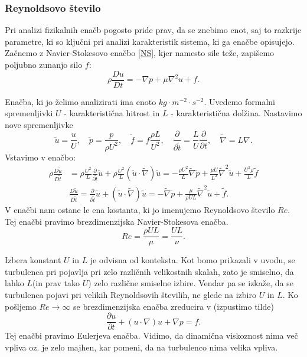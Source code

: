 \documentclass[mat2, tisk]{fmfdelo}
\begin{document}
\subsubsection{Reynoldsovo število}
Pri analizi fizikalnih enačb pogosto pride prav, da se znebimo enot, saj to razkrije 
parametre, ki so ključni pri analizi karakteristik sistema, ki ga enačbe opisujejo. 
Začnemo z Navier-Stokesovo enačbo \eqref{NS}, kjer namesto sile teže, zapišemo 
poljubno zunanjo silo $f$:
$$
\rho \frac{D u}{D t} = - \nabla p + \mu \nabla^2 u + f.
$$

Enačba, ki jo želimo analizirati ima enoto $kg \cdot m^{-2}\cdot s^{-2}$. Uvedemo formalni 
spremenljivki $U$ - karakteristična hitrost in $L$ - karakteristična dolžina. Nastavimo
nove spremenljivke 
$$
\tilde{u} = \frac{u}{U}, \quad \tilde{p} = \frac{p}{\rho U^2}, \quad \tilde{f} = f\frac{\rho L}{U^2},
\quad \frac{\partial}{\partial \tilde{t}} = \frac{L}{U} \frac{\partial}{\partial t}, \quad 
\tilde{\nabla} = L\nabla.
$$
Vstavimo v enačbo:
\begin{align*}
\rho \frac{D\tilde{u}}{D \tilde{t}} &= \rho \frac{U^2}{L} \frac{\partial}{\partial \tilde{t}} \tilde{u} + 
\rho \frac{U^2}{L} (\tilde{u} \cdot \tilde{\nabla}) \tilde{u} = - \frac{\rho U^2}{L} \tilde{\nabla} \tilde{p}
+ \frac{\mu U}{L^2} \tilde{\nabla}^2 \tilde{u} + \frac{U^2 \rho}{L}\tilde{f} \\[2mm]
&\frac{D\tilde{u}}{D \tilde{t}} = \frac{\partial}{\partial \tilde{t}} \tilde{u} + 
(\tilde{u} \cdot \tilde{\nabla}) \tilde{u} = - \tilde{\nabla} \tilde{p}
+ \frac{\mu}{\rho UL} \tilde{\nabla}^2 \tilde{u} + \tilde{f}.
\end{align*}
V enačbi nam ostane le ena kostanta, ki jo imenujemo Reynoldsovo število $Re$. Tej enačbi 
pravimo brezdimenzijska Navier-Stokesova enačba.
\begin{equation}
Re = \frac{\rho UL}{\mu} = \frac{UL}{\nu}.
\end{equation}

Izbera konstant $U$ in $L$ je odvisna od konteksta. Kot bomo prikazali v uvodu, 
se turbulenca pri pojavlja pri zelo različnih velikostnih skalah, zato je smiselno, da 
lahko $L$(in prav tako $U$) zelo različne smiselne izbire. Vendar pa se izkaže, da se 
turbulenca pojavi pri velikih Reynoldsovih številih, ne glede na izbiro $U$ in $L$.
Ko pošljemo $Re \rightarrow \infty$ se brezdimenzijska enačba zreducira v (izpustimo tilde)
\begin{equation}
\label{Euler NS}
\frac{\partial u}{\partial t} + (u\cdot \nabla)u + \nabla p = f.
\end{equation}
Tej enačbi pravimo Eulerjeva enačba. Vidimo, da dinamična viskoznost nima več vpliva
oz. je zelo majhen, kar pomeni, da na turbulenco nima velika vpliva. \\
\end{document}
